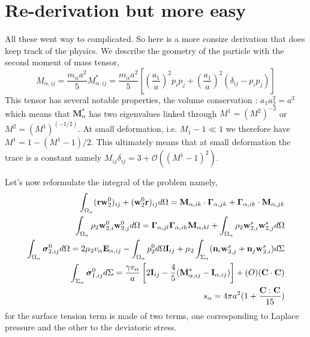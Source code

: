 
\section*{Re-derivation but more easy}
All these went way to complicated. 
So here is a more consize derivation that does keep track of the physics. 
We describe the geometry of the particle with the second moment of mass tensor, 
\begin{equation*}
    M_{\alpha,ij} 
    =\frac{m_\alpha a^2}{5} M_{\alpha,ij}^*
    = \frac{m_\alpha a^2}{5}\left[
        \left(
            \frac{a_1}{a}
        \right)^2 p_i p_j
        + 
        \left(
            \frac{a_1}{a}
        \right)^2(\delta_{ij}-  p_i p_j)
    \right]
\end{equation*}
This tensor has several notable properties, the volume conservation : $a_1 a_2^2 = a^3$ which means that $\textbf{M}_\alpha^*$ has two eigenvalues linked through $M^1 = (M^2)^{-2}$ or $M^2 = (M^1)^(-1/2)$. 
At small deformation, i.e. $M_1 - 1\ll 1$ we therefore have $M^1 = 1 - (M^1-1)/2$.
This ultimately means that at small deformation the trace is a constant namely $M_{ij} \delta_{ij} = 3+\mathcal{O}((M^1 -1)^2)$. 




Let's now reformulate the integral of the problem namely, 
\begin{align}
    \int_{\Omega_\alpha} (\textbf{rw}_ 2^0 )_{ij}+ (\textbf{w}_2^0 \textbf{r})_{ij} d\Omega 
    = \textbf{M}_{\alpha,ik} \cdot \bm\Gamma_{\alpha,jk}
        +  \bm\Gamma_{\alpha,ik} \cdot \textbf{M}_{\alpha,jk}
    \\
    \int_{\Omega_\alpha} \rho_2 \textbf{w}_{2,i}^0\textbf{w}_{2,j}^0 d\Omega
    = \bm\Gamma_{\alpha,jl}\bm\Gamma_{\alpha,ik} \textbf{M}_{\alpha,kl}  
        +\int_{\Omega_\alpha} \rho_2 \textbf{w}_{2,i}^s\textbf{w}_{2,j}^s d\Omega
    \\
    \int_{\Omega_\alpha} \bm\sigma_{2,ij}^0 d\Omega
    =
    2 \mu_2 v_\alpha \textbf{E}_{\alpha,ij}
    - \int_{\Omega_\alpha} p_2^0 d\Omega \textbf{I}_{ij}
    + \mu_2 \int_{\Sigma_\alpha} (\textbf{n}_i \textbf{w}_{2,j}^s + \textbf{n}_j \textbf{w}_{2,i}^s) d\Sigma
    \\
    \int_{\Sigma_\alpha} \bm\sigma_{I,ij}^0 d\Sigma
    = \frac{\gamma v_\alpha }{a} \left[
        2\textbf{I}_{ij} 
        - \frac{4  }{5} (\textbf{M}_{\alpha,ij}^* - \textbf{I}_{\alpha,ij})
    \right]
    +\mathcal(O)(\textbf{C}\cdot \textbf{C})\\
    s_\alpha 
    = 4\pi a^2 (1+\frac{\textbf{C}:\textbf{C}}{15})
\end{align}
for the surface tension term is made of two terms, one corresponding to Laplace pressure and the other to the deviatoric stress. 




